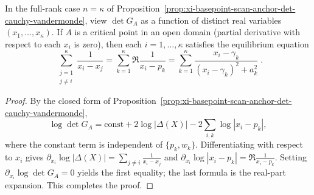 \begin{proposition}\label{prop:xi-basepoint-scan-full-rank-anchor-critical-equations}
In the full-rank case \(n=\kappa\) of Proposition~\ref{prop:xi-basepoint-scan-anchor-det-cauchy-vandermonde}, view \(\det G_A\) as a function of distinct real variables \((x_1,\dots,x_\kappa)\).
If \(A\) is a critical point in an open domain (partial derivative with respect to each \(x_i\) is zero), then each \(i=1,\dots,\kappa\) satisfies the equilibrium equation
\[
\boxed{\;
\sum_{\substack{j=1\\ j\ne i}}^{\kappa}\frac{1}{x_i-x_j}
=\sum_{k=1}^{\kappa}\Re\frac{1}{x_i-p_k}
=\sum_{k=1}^{\kappa}\frac{x_i-\gamma_k}{(x_i-\gamma_k)^2+a_k^2}\; }.
\]
\end{proposition}
\begin{proof}
By the closed form of Proposition~\ref{prop:xi-basepoint-scan-anchor-det-cauchy-vandermonde},
\[
\log\det G_A=\mathrm{const}+2\log|\Delta(X)|-2\sum_{i,k}\log|x_i-p_k|,
\]
where the constant term is independent of \(\{p_k,w_k\}\).
Differentiating with respect to \(x_i\) gives
\(
\partial_{x_i}\log|\Delta(X)|=\sum_{j\ne i}\frac{1}{x_i-x_j}
\)
and
\(
\partial_{x_i}\log|x_i-p_k|=\Re\frac{1}{x_i-p_k}
\).
Setting \(\partial_{x_i}\log\det G_A=0\) yields the first equality; the last formula is the real-part expansion. This completes the proof.
\end{proof}

